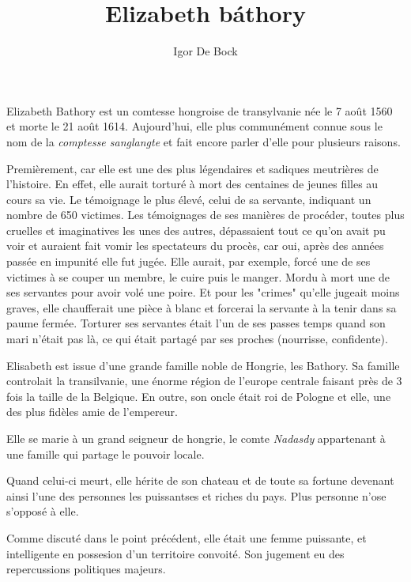 \documentclass[a4paper, 12pt]{article}
\author{Igor De Bock}
\title{Elizabeth b\'athory}
\begin{document}
    \maketitle
    Elizabeth Bathory est un comtesse hongroise de transylvanie née le 7
    août 1560 et morte le 21 août 1614. Aujourd'hui, elle plus communément
    connue sous le nom de la \textit{comptesse sanglangte} et fait encore parler
    d'elle pour plusieurs raisons.
    
    Premièrement, car elle est une des plus légendaires et sadiques meutrières
    de l'histoire. En effet, elle aurait torturé à mort des centaines de jeunes
    filles au cours sa vie. Le témoignage le plus élevé, celui de sa servante,
    indiquant un nombre de 650 victimes. Les témoignages de ses manières de
    procéder, toutes plus cruelles et imaginatives les unes des autres,
    dépassaient tout ce qu'on avait pu voir et auraient fait vomir les
    spectateurs du procès, car oui, après des années passée en impunité elle fut
    jugée. Elle aurait, par exemple, forcé une de ses victimes à se couper un
    membre, le cuire puis le manger. Mordu à mort une de ses servantes pour avoir
    volé une poire. Et pour les "crimes" qu'elle jugeait moins graves, elle
    chaufferait une pièce à blanc et forcerai la servante à la tenir dans sa
    paume fermée. Torturer ses servantes était l'un de ses passes temps quand
    son mari n'était pas là, ce qui était partagé par ses proches (nourrisse,
    confidente).

    Elisabeth est issue d'une grande famille noble de Hongrie, les Bathory. Sa
    famille controlait la transilvanie, une énorme région de l'europe centrale
    faisant près de 3 fois la taille de la Belgique. En outre, son oncle était 
    roi de Pologne et elle, une des plus fidèles amie de l'empereur.

    Elle se marie à un grand seigneur de hongrie, le comte \textit{Nadasdy} 
    appartenant à une famille qui partage le pouvoir locale. 
    
    Quand celui-ci meurt, elle hérite de son chateau et de toute sa fortune
    devenant ainsi l'une des personnes les puissantses et riches du pays. Plus
    personne n'ose s'opposé à elle.

    Comme discuté dans le point précédent, elle était une femme puissante, et
    intelligente en possesion d'un territoire convoité. Son jugement eu des
    repercussions politiques majeurs.
\end{document}

